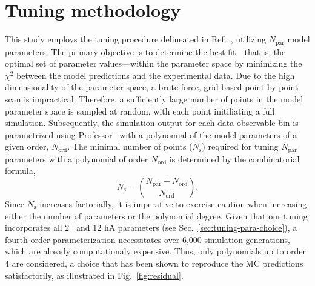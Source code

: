 \section{\label{sec:Tuning-method}Tuning methodology}
This study employs the tuning procedure delineated in Ref.~\cite{GENIE:2022qrc}, utilizing $N_{\textrm{par}}$ model parameters. 
The primary objective is to determine the best fit—that is, the optimal set of parameter values—within the parameter space by minimizing the $\chi^2$ between the model predictions and the experimental data. 
Due to the high dimensionality of the parameter space, a brute-force, grid-based point-by-point scan is impractical. 
Therefore, a sufficiently large number of points in the model parameter space is sampled at random, with each point initiliating a full simulation. 
Subsequently, the simulation output for each data observable bin is parametrized using Professor~\cite{Buckley:2009bj} with a polynomial of the model parameters of a given order, $N_{\textrm{ord}}$. 
The minimal number of points ($N_{\textrm{s}}$) required for tuning $N_{\textrm{par}}$ parameters with a polynomial of order $N_{\textrm{ord}}$ is determined by the combinatorial formula,
\begin{equation}
    N_{\textrm{s}} = \binom{N_{\textrm{par}}+N_{\textrm{ord}}}{N_{\textrm{ord}}}.
\end{equation}
Since $N_\textrm{s}$ increases factorially, it is imperative to exercise caution when increasing either the number of parameters or the polynomial degree. 
Given that our tuning incorporates all $2$ \sfcfg\ and $12$ hA parameters (see Sec.~\ref{sec:tuning-para-choice}), a fourth-order parameterization necessitates over 6,000 simulation generations, which are already computationaly expensive.
Thus, only polynomials up to order $4$ are considered, a choice that has been shown to reproduce the MC predictions satisfactorily, as illustrated in Fig.~\ref{fig:residual}. 
